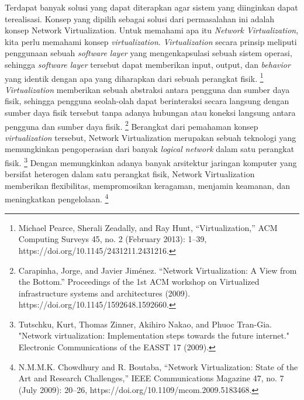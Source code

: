 Terdapat banyak solusi yang dapat diterapkan agar sistem yang diinginkan dapat terealisasi. Konsep yang dipilih sebagai solusi dari permasalahan ini adalah konsep Network
Virtualization. Untuk memahami apa itu \textit{Network Virtualization}, kita perlu memahami konsep \textit{virtualization}.
\textit{Virtualization} secara prinsip meliputi penggunaan sebuah \textit{software layer} yang mengenkapsulasi sebuah sistem operasi, sehingga
\textit{software layer} tersebut dapat memberikan input, output, dan \textit{behavior} yang identik dengan apa yang diharapkan dari sebuah perangkat fisik.
\footnote{Michael Pearce, Sherali Zeadally, and Ray Hunt, “Virtualization,” ACM Computing Surveys 45, no. 2 (February 2013): 1–39, https://doi.org/10.1145/2431211.2431216.}
\textit{Virtualization} memberikan sebuah abstraksi antara pengguna dan sumber daya fisik, sehingga pengguna seolah-olah dapat berinteraksi secara langsung dengan
sumber daya fisik tersebut tanpa adanya hubungan atau koneksi langsung antara pengguna dan sumber daya fisik.
\footnote{Carapinha, Jorge, and Javier Jiménez. “Network Virtualization: A View from the Bottom.” Proceedings of the 1st ACM workshop on Virtualized infrastructure systems and architectures (2009). https://doi.org/10.1145/1592648.1592660. }
Berangkat dari pemahaman konsep \textit{virtualization} tersebut, Network Virtualization merupakan sebuah teknologi yang memungkinkan pengoperasian dari 
banyak \textit{logical network} dalam satu perangkat fisik.
\footnote{Tutschku, Kurt, Thomas Zinner, Akihiro Nakao, and Phuoc Tran-Gia. "Network virtualization: Implementation steps towards the future internet." Electronic Communications of the EASST 17 (2009).}
Dengan memungkinkan adanya banyak arsitektur jaringan komputer yang bersifat heterogen dalam satu perangkat fisik, Network Virtualization memberikan flexibilitas, mempromosikan keragaman, menjamin keamanan, 
dan meningkatkan pengelolaan.
\footnote{N.M.M.K. Chowdhury and R. Boutaba, “Network Virtualization: State of the Art and Research Challenges,” IEEE Communications Magazine 47, no. 7 (July 2009): 20–26, https://doi.org/10.1109/mcom.2009.5183468.}
\par



